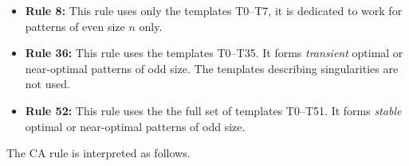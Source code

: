 \documentclass[10pt,a4paper]{article}  %
\begin{document}
\begin{itemize}
  \item \textbf{Rule 8:} 
  This rule uses only the templates T0--T7, 
  it is dedicated to work for patterns of even size $n$ only.  
  
	\item \textbf{Rule 36:}    
  This rule uses the templates T0--T35.
  It  forms \textit{transient} optimal or near-optimal patterns of odd size. 
  The templates describing singularities are not used. 

	\item\textbf{Rule 52:}  
  This rule uses the the full set of templates T0--T51.
  It forms \textit{stable} optimal or near-optimal patterns of odd size.   
  
\end{itemize}

The CA rule is interpreted as follows.
\end{document}
